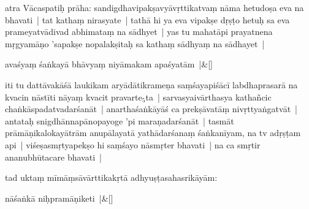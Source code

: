 \documentclass[article,12pt,a4paper]{memoir}%
\newcounter{parCount}
\begin{document}
	  
	  \pstart \leavevmode%
	\hphantom{.}\label{thakur75-42.8}atra Vācaspatiḥ prāha: sandigdhavipakṣavyāvṛttikatvaṃ nāma hetudoṣa eva na bhavati | tat kathaṃ nirasyate | tathā hi ya eva vipakṣe dṛṣṭo hetuḥ sa eva prameyatvādivad abhimataṃ na sādhyet | yas tu mahatāpi prayatnena mṛgyamāṇo 'sapakṣe nopalakṣitaḥ sa kathaṃ sādhyaṃ na sādhayet | 
	    \pend%
	  
	    
	    \stanza[\smallbreak]
	  \label{sarit__ratnakīrtinibandhāvali__111722}avaśyaṃ śaṅkayā bhāvyaṃ niyāmakam apaśyatām |\label{sarit__ratnakīrtinibandhāvali__111823}\&[\smallbreak]
	  
	  
	  
	    \pstart  \leavevmode%
	    \hphantom{.}
	   iti tu dattāvakāśā laukikam aryādātikrameṇa saṃśayapiśācī labdhaprasarā na kvacin nāstīti nāyaṃ kvacit pravarte{\tiny $_{5}$}ta | sarvasyaivārthasya kathañcic chaṅkāspada\label{ratnakīrtinibandhāvali__36r1PF7IMW74UT7SUMA8GL8PWHC}tvadarśanāt\label{ratnakīrtinibandhāvali__36r1PF7IMW6DS4HL565OJR8D4FX} | anarthaśaṅkāyāś ca prekṣāvatāṃ nivṛttyaṅgatvāt | antataḥ snigdhānnapānopayoge 'pi maraṇadarśanāt | tasmāt prāmāṇikalokayātrām anupālayatā yathādarśanaṃ śaṅkanīyam, na tv adṛṣṭam api | viśeṣasmṛtyapekṣo hi saṃśayo nāsmṛter bhavati | na ca smṛtir ananubhūtacare bhavati |
	{}
	\pend%
      

	  
	  \pstart \leavevmode%
	\label{thakur75-42.19}tad uktaṃ mīmāṃsāvārttikakṛ\leavevmode{}tā adhyuṣṭasahasrikāyām: 
	    \pend%
	  
	    
	    \stanza[\smallbreak]
	  nāśaṅkā niḥpramāṇiketi |\&[\smallbreak]
	  
\end{document}
